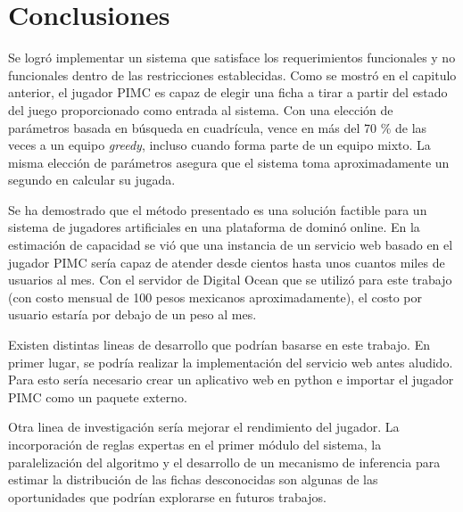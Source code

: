 \chapter*{Conclusiones}


\noindent
Se logró implementar un sistema que satisface los requerimientos funcionales y
no funcionales dentro de las restricciones establecidas. Como se mostró en el
capitulo anterior, el jugador PIMC es capaz de elegir una ficha a tirar a partir
del estado del juego proporcionado como entrada al sistema. Con una elección de
parámetros basada en búsqueda en cuadrícula, vence en más del 70 \% de las veces
a un equipo \textit{greedy}, incluso cuando forma parte de un equipo mixto. La
misma elección de parámetros asegura que el sistema toma aproximadamente un
segundo en calcular su jugada.

Se ha demostrado que el método presentado es una solución factible para un
sistema de jugadores artificiales en una plataforma de dominó online. En la
estimación de capacidad se vió que una instancia de un servicio web basado en el
jugador PIMC sería capaz de atender desde cientos hasta unos cuantos miles de
usuarios al mes. Con el servidor de Digital Ocean que se utilizó para este
trabajo (con costo mensual de 100 pesos mexicanos aproximadamente), el costo por
usuario estaría por debajo de un peso al mes.

Existen distintas lineas de desarrollo que podrían basarse en este trabajo. En
primer lugar, se podría realizar la implementación del servicio web antes
aludido. Para esto sería necesario crear un aplicativo web en python e importar
el jugador PIMC como un paquete externo.

Otra linea de investigación sería mejorar el rendimiento del jugador. La
incorporación de reglas expertas en el primer módulo del sistema, la
paralelización del algoritmo y el desarrollo de un mecanismo de inferencia para
estimar la distribución de las fichas desconocidas son algunas de las
oportunidades que podrían explorarse en futuros trabajos.